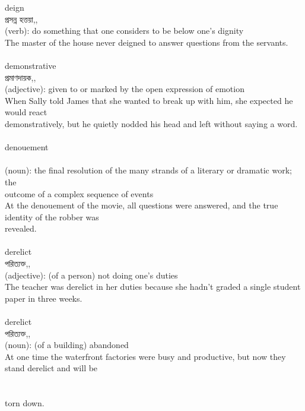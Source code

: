 \documentclass{article}
\begin{document}
{deign}\\
{প্রসন্ন হত্তয়া,,}\\
{(verb): do something that one considers to be below one's dignity\\The master of the house never deigned to answer questions from the servants.\\}\\
{demonstrative}\\
{প্রমাণদায়ক,,}\\
{(adjective): given to or marked by the open expression of emotion\\When Sally told James that she wanted to break up with him, she expected he would react\\demonstratively, but he quietly nodded his head and left without saying a word.\\}\\
{denouement}\\
{}\\
{(noun): the final resolution of the many strands of a literary or dramatic work; the\\outcome of a complex sequence of events\\At the denouement of the movie, all questions were answered, and the true identity of the robber was\\revealed.\\}\\
{derelict}\\
{পরিত্যক্ত,,}\\
{(adjective): (of a person) not doing one's duties\\The teacher was derelict in her duties because she hadn't graded a single student paper in three weeks.\\}\\
{derelict}\\
{পরিত্যক্ত,,}\\
{(noun): (of a building) abandoned\\At one time the waterfront factories were busy and productive, but now they stand derelict and will be\\\\                                                                                \\torn down.\\}\\
{desiccated}\\
{শুকিয়ে নেওয়া,,}\\
{(adjective): uninteresting, lacking vitality\\Few novelists over 80 are able to produce anything more than desiccated works--boring shadows of\\former books.\\This word has other definitions but this is the most important one for the GRE\\}\\
\end{document}

